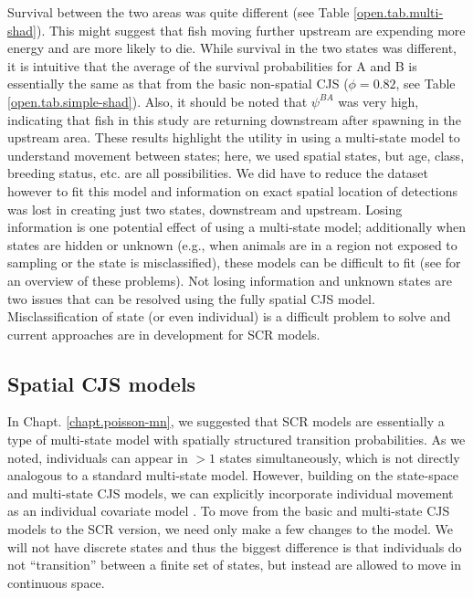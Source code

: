 Survival between the two areas was quite different (see Table
\ref{open.tab.multi-shad}).  This might suggest that fish moving
further upstream are expending more energy and are more likely to die.
While survival in the two states was different, it is intuitive that
the average of the survival probabilities for A and B is essentially
the same as that from the basic non-spatial CJS ($\phi = 0.82$, see
Table \ref{open.tab.simple-shad}).  Also, it should be noted that
$\psi^{BA}$ was very high, indicating that fish in this study are
returning downstream after spawning in the upstream area.  These
results highlight the utility in using a multi-state model to
understand movement between states; here, we used spatial states, but
age, class, breeding status, etc. are all possibilities.  We did have
to reduce the  
dataset however to fit this model and information on exact spatial location of detections
was lost in creating just two states, downstream and upstream.  Losing
information is one potential effect of using a multi-state model;
additionally when states are hidden or unknown (e.g., when animals are
in a region not exposed to sampling or the state is misclassified),
these models can be difficult to fit (see \citet{conn_cooch:2009} for
an overview of these problems).  Not losing information and unknown
states are two issues that can be resolved using the fully spatial CJS
model.  Misclassification of state (or even individual) is a difficult
problem to solve and current approaches \citep{link_etal:2010,
  mcclintock_etal:inpress} are in development for SCR models.  



\subsection{Spatial CJS models}

In Chapt. \ref{chapt.poisson-mn}, we suggested that SCR models are 
essentially a type of multi-state model with spatially structured
transition probabilities.  As we noted, individuals can appear in $>1$
states simultaneously, which is not directly analogous to a standard
multi-state model.  However, building on the state-space and
multi-state CJS models, we can explicitly incorporate individual
movement as an individual covariate model \citep{royle_indcov:2007}.
To move from the basic and multi-state CJS models to the SCR version,
we need only make a few changes to the model.  We will
not have discrete states and thus the biggest difference is that
individuals do not ``transition'' between a finite set of states, but
instead are allowed to move in continuous space.

